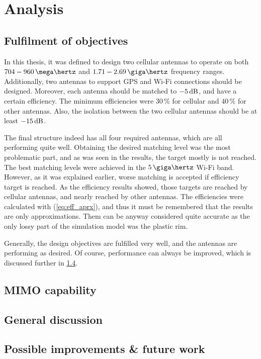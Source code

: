 \section{Analysis}
\label{sec:analysis}


\subsection{Fulfilment of objectives}
\label{sec:fulfilment}
In this thesis, it was defined to design two cellular antennas to operate on both $704-960\,\mega\hertz$ and $1.71-2.69\,\giga\hertz$ frequency ranges. Additionally, two antennas to support GPS and Wi-Fi connections should be designed. Moreover, each antenna should be matched to $-5\,\mathrm{dB}$, and have a certain efficiency. The minimum efficiencies were $30\,\%$ for cellular and $40\,\%$ for other antennas. Also, the isolation between the two cellular antennas should be at least $-15\,\mathrm{dB}$.

The final structure indeed has all four required antennas, which are all performing quite well. Obtaining the desired matching level was the most problematic part, and as was seen in the results, the target mostly is not reached. The best matching levels were achieved in the $5\,\giga\hertz$ Wi-Fi band. However, as it was explained earlier, worse matching is accepted if efficiency target is reached. As the efficiency results showed, those targets are reached by cellular antennas, and nearly reached by other antennas. The efficiencies were calculated with (\ref{eq:eff_aprx}), and thus it must be remembered that the results are only approximations. Them can be anyway considered quite accurate as the only lossy part of the simulation model was the plastic rim.

Generally, the design objectives are fulfilled very well, and the antennas are performing as desired. Of course, performance can always be improved, which is discussed further in \ref{sec:improvements}.

\subsection{MIMO capability}
\label{sec:mimo_cap}

\subsection{General discussion}
\label{sec:general_discussion}



\subsection{Possible improvements \& future work}
\label{sec:improvements}



\clearpage